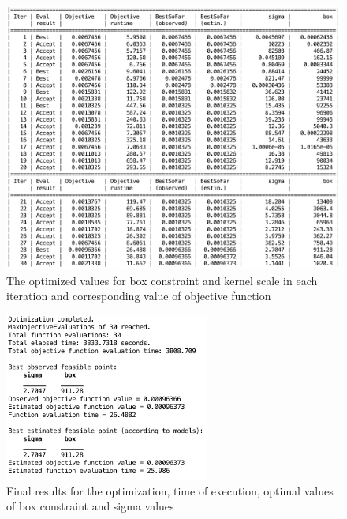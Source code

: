 \begin{figure}
\begin{center}
\includegraphics[width=1.13\textwidth]{figures/optimizationSummaryStuckFault}    %
\caption{The optimized values for box constraint and kernel scale in each iteration and corresponding value of objective function} 
\label{fig:optBayesianSteps}
\end{center}
\end{figure}

\begin{figure}
\begin{center}
\includegraphics[width=0.6\textwidth]{figures/optimizationResultsStuckFault}    %
\caption{Final results for the optimization, time of execution, optimal values of box constraint and sigma values} 
\label{fig:optimBayesianResults}
\end{center}
\end{figure}


